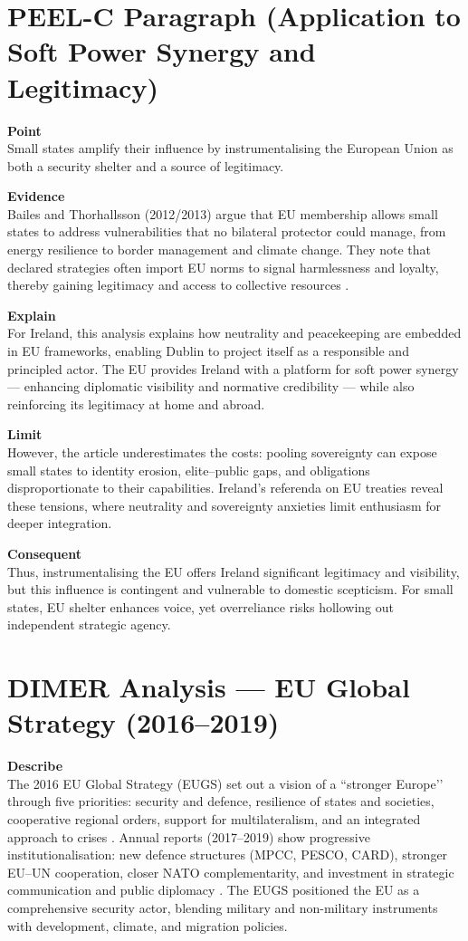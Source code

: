 \section*{PEEL-C Paragraph (Application to Soft Power Synergy and Legitimacy)}

\textbf{Point} \\
Small states amplify their influence by instrumentalising the European Union as both a security shelter and a source of legitimacy.  

\textbf{Evidence} \\
Bailes and Thorhallsson (2012/2013) argue that EU membership allows small states to address vulnerabilities that no bilateral protector could manage, from energy resilience to border management and climate change. They note that declared strategies often import EU norms to signal harmlessness and loyalty, thereby gaining legitimacy and access to collective resources \parencite{BAILES_2012}.  

\textbf{Explain} \\
For Ireland, this analysis explains how neutrality and peacekeeping are embedded in EU frameworks, enabling Dublin to project itself as a responsible and principled actor. The EU provides Ireland with a platform for soft power synergy — enhancing diplomatic visibility and normative credibility — while also reinforcing its legitimacy at home and abroad.  

\textbf{Limit} \\
However, the article underestimates the costs: pooling sovereignty can expose small states to identity erosion, elite–public gaps, and obligations disproportionate to their capabilities. Ireland’s referenda on EU treaties reveal these tensions, where neutrality and sovereignty anxieties limit enthusiasm for deeper integration.  

\textbf{Consequent} \\
Thus, instrumentalising the EU offers Ireland significant legitimacy and visibility, but this influence is contingent and vulnerable to domestic scepticism. For small states, EU shelter enhances voice, yet overreliance risks hollowing out independent strategic agency.  


\section*{DIMER Analysis — EU Global Strategy (2016–2019)}

\textbf{Describe} \\  
The 2016 EU Global Strategy (EUGS) set out a vision of a ``stronger Europe’’ through five priorities: security and defence, resilience of states and societies, cooperative regional orders, support for multilateralism, and an integrated approach to crises \parencite{EU_2016}. Annual reports (2017–2019) show progressive institutionalisation: new defence structures (MPCC, PESCO, CARD), stronger EU–UN cooperation, closer NATO complementarity, and investment in strategic communication and public diplomacy \parencite{EU_2017,EU_2018,EU_2019} . The EUGS positioned the EU as a comprehensive security actor, blending military and non-military instruments with development, climate, and migration policies.  

